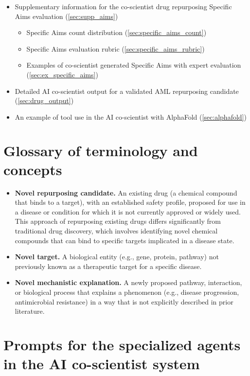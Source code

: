\begin{itemize}[leftmargin=1.5em,rightmargin=0em]
    \item Supplementary information for the co-scientist drug repurposing Specific Aims evaluation (\cref{sec:supp_aims})
    \begin{itemize}
        \item Specific Aims count distribution (\cref{sec:specific_aims_count})
        \item Specific Aims evaluation rubric (\cref{sec:specific_aims_rubric})
        \item Examples of co-scientist generated Specific Aims with expert evaluation (\cref{sec:ex_specific_aims})
    \end{itemize}
    \item Detailed AI co-scientist output for a validated AML repurposing candidate (\cref{sec:drug_output})
    \item An example of tool use in the AI co-scientist with AlphaFold (\cref{sec:alphafold})
\end{itemize}


\section{Glossary of terminology and concepts}
\label{sec:glossary}

\begin{itemize}
    \item \textbf{Novel repurposing candidate.} An existing drug (a chemical compound that binds to a target), with an established safety profile, proposed for use in a disease or condition for which it is not currently approved or widely used. This approach of repurposing existing drugs differs significantly from traditional drug discovery, which involves identifying novel chemical compounds that can bind to specific targets implicated in a disease state.
    \item \textbf{Novel target.} A biological entity (e.g., gene, protein, pathway) not previously known as a therapeutic target for a specific disease.
    \item \textbf{Novel mechanistic explanation.} A newly proposed pathway, interaction, or biological process that explains a phenomenon (e.g., disease progression, antimicrobial resistance) in a way that is not explicitly described in prior literature.
\end{itemize}


\clearpage
\section{Prompts for the specialized agents in the AI co-scientist system}
\label{sec:prompts}







